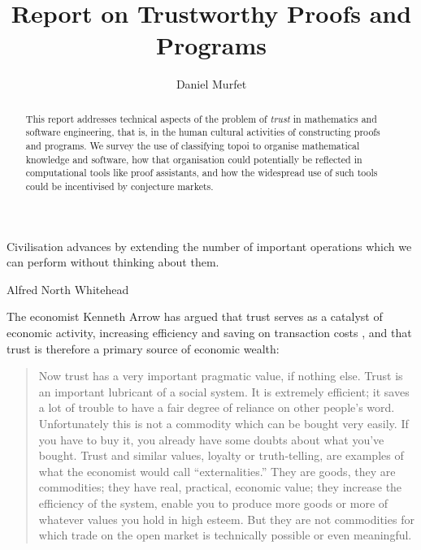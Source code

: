 \documentclass[english,letter paper,12pt,reqno]{article}
\theoremstyle{example}
\def\res{\operatorname{Res}}
\begin{document}
\def\ScoreOverhang{1pt}

\def\Res{\res\!}
\newcommand{\ud}[1]{\operatorname{d}\!{#1}}
\newcommand{\Ress}[1]{\res_{#1}\!}
\newcommand{\cat}[1]{\mathcal{#1}}
\newcommand{\lto}{\longrightarrow}
\newcommand{\xlto}[1]{\stackrel{#1}\lto}
\newcommand{\mf}[1]{\mathfrak{#1}}
\newcommand{\md}[1]{\mathscr{#1}}
\newcommand{\church}[1]{\underline{#1}}
\newcommand{\prf}[1]{\underline{#1}}
\newcommand{\den}[1]{\llbracket #1 \rrbracket}
\def\l{\,|\,}
\def\sgn{\textup{sgn}}
\def\cont{\operatorname{cont}}

\title{Report on Trustworthy Proofs and Programs}
\author{Daniel Murfet}

\maketitle

\begin{abstract} This report addresses technical aspects of the problem of \emph{trust} in mathematics and software engineering, that is, in the human cultural activities of constructing proofs and programs. We survey the use of classifying topoi to organise mathematical knowledge and software, how that organisation could potentially be reflected in computational tools like proof assistants, and how the widespread use of such tools could be incentivised by conjecture markets.
\end{abstract}

\tableofcontents

\setlength{\epigraphwidth}{0.6\textwidth}
\epigraph{Civilisation advances by extending the number of important operations which we can perform without thinking about them.}{Alfred North Whitehead}


The economist Kenneth Arrow has argued that trust serves as a catalyst of economic activity, increasing efficiency and saving on transaction costs \cite[p.23]{arrow}, \cite{fukuyama} and that trust is therefore a primary source of economic wealth:

\begin{quote}
Now trust has a very important pragmatic value, if nothing else. Trust is an important lubricant of a social system. It is extremely efficient; it saves a lot of trouble to have a fair degree of reliance on other people's word. Unfortunately this is not a commodity which can be bought very easily. If you have to buy it, you already have some doubts about what you've bought. Trust and similar values, loyalty or truth-telling, are examples of what the economist would call ``externalities.'' They are goods, they are commodities; they have real, practical, economic value; they increase the efficiency of the system, enable you to produce more goods or more of whatever values you hold in high esteem. But they are not commodities for which trade on the open market is technically possible or even meaningful.
\end{quote}
\end{document}
